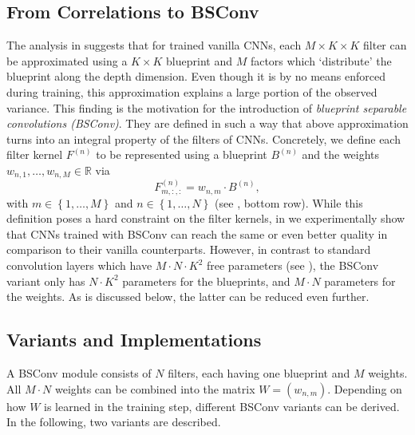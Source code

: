 \documentclass[10pt,twocolumn,letterpaper]{article}
\newcommand{\DCCK}{BSConv\xspace}
\newcommand{\R}{\mathbb{R}}
\newcommand{\filter}[1]{F^{(#1)}}
\newcommand{\blueprint}[1]{B^{(#1)}}
\newcommand{\weight}{w}
\newcommand{\weightMatrix}{W}
\newcommand{\spatialK}{K}
\newcommand{\channelInCount}{M}
\newcommand{\channelInIndex}{m}
\newcommand{\channelOutCount}{N}
\newcommand{\channelOutIndex}{n}
\begin{document}
\subsection{From Correlations to \DCCK}
\label{subsec:dcck}
The analysis in  suggests that for trained vanilla CNNs, each $\channelInCount \times \spatialK \times \spatialK$ filter can be approximated using a $\spatialK \times \spatialK$ blueprint and $\channelInCount$ factors which `distribute' the blueprint along the depth dimension.
Even though it is by no means enforced during training, this approximation explains a large portion of the observed variance.
This finding is the motivation for the introduction of \textit{blueprint separable convolutions (\DCCK)}.
They are defined in such a way that above approximation turns into an integral property of the filters of CNNs.
Concretely, we define each filter kernel $\filter{\channelOutIndex}$ to be represented using a blueprint $\blueprint{\channelOutIndex}$ and the weights $\weight_{\channelOutIndex, 1}, \dots, \weight_{\channelOutIndex, \channelInCount} \in \R$ via
\begin{equation}
\filter{\channelOutIndex}_{\channelInIndex, :, :} = \weight_{\channelOutIndex, \channelInIndex} \cdot \blueprint{\channelOutIndex},
\label{eq:dcck}
\end{equation}
with $\channelInIndex \in \left\{1, \dots, \channelInCount \right\}$ and $\channelOutIndex \in \left\{1, \dots, \channelOutCount \right\}$ (see , bottom row).
While this definition poses a hard constraint on the filter kernels, in  we experimentally show that CNNs trained with \DCCK can reach the same or even better quality in comparison to their vanilla counterparts.
However, in contrast to standard convolution layers which have $\channelInCount \cdot \channelOutCount \cdot \spatialK^2$ free parameters (see ), the \DCCK variant only has $\channelOutCount \cdot \spatialK^2$ parameters for the blueprints, and $\channelInCount \cdot \channelOutCount$ parameters for the weights.
As is discussed below, the latter can be reduced even further.

\subsection{Variants and Implementations}
\label{subsec:dcckVariants}
A \DCCK module consists of $\channelOutCount$ filters, each having one blueprint and $\channelInCount$ weights.
All $\channelInCount \cdot \channelOutCount$ weights can be combined into the matrix $\weightMatrix = (\weight_{\channelOutIndex, \channelInIndex})$.
Depending on how $\weightMatrix$ is learned in the training step, different \DCCK variants can be derived.
In the following, two variants are described.
\end{document}
